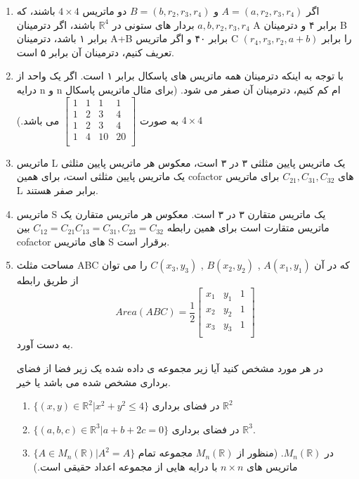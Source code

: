 \documentclass{article}
\begin{document}
\begin{enumerate}[label=\alph*)]
	     \item 
	     اگر
	     $A = (a , r_2 , r_3, r_4)$
	     و
	     $B = (b , r_2, r_3, r_4)$
	     دو ماتریس 
	     $4\times 4 $ 
	     باشند، که
	     $a , b , r_2 , r_3, r_4$
	     بردار های ستونی در 
	     $\mathbb{R}^4$
	     باشند، اگر دترمینان A  برابر ۴ و دترمینان B  برابر ۱ باشد، دترمینان A+B برابر ۴۰ و اگر ماتریس C را برابر 
	     $(r_4, r_3,r_2,a+b) $
	     تعریف کنیم، دترمینان آن برابر ۵ است.
	     \item
	     با توجه به اینکه دترمینان همه ماتریس های پاسکال برابر ۱ است. اگر یک واحد از درایه n و n ام کم کنیم، دترمینان آن صفر می شود.
	     (برای مثال ماتریس پاسکال
	     $4\times 4 $ 
	     به صورت 
	    $\begin{bmatrix}
	    1 & 1 & 1 & 1 \\
	    1 & 2 & 3 & 4 \\
	    1 & 2 &3 & 4\\
	     1 & 4 &10 & 20\\
	    \end{bmatrix}$
	    می باشد.)
	    \item 
	    ماتریس L یک ماتریس پایین مثلثی ۳ در ۳ است، معکوس هر ماتریس پایین مثلثی یک ماتریس پایین مثلثی است، برای همین cofactor های 
	    $C_{21}, C_{31}, C_{32}$
	   برای ماتریس L برابر صفر هستند.
	   \item
	   ماتریس S یک ماتریس متقارن ۳ در ۳ است. معکوس هر ماتریس متقارن یک ماتریس متقارت است برای همین رابطه 
	   $ C_{12}=C_{21} C_{13}=C_{31}, C_{23}=C_{32}$
	   بین cofactor های ماتریس S برقرار است.
	   \item
	   مساحت مثلث ABC که در آن 
	   $A(x_1,y_1)$
	   ,
	   $B(x_2,y_2)$
	   ,
	   $C(x_3,y_3)$
	 را می توان از طریق رابطه 
	   $$Area(ABC) = \frac{1}{2}
	   \begin{bmatrix}
	   	x_1 &y_1& 1\\
	   	x_2 &y_2&1\\
	   	x_3 &y_3&1\\
	   \end{bmatrix}$$
   به دست آورد.
   
   

در هر مورد مشخص کنید آیا زیر مجموعه ی داده شده یک زیر فضا از فضای برداری مشخص شده می باشد یا خیر.
\begin{enumerate}
	\item 
	$\{(x,y)\in\mathbb{R}^2|x^2+y^2 \leq4\}$
	در فضای برداری 
	$\mathbb{R}^2$
	\item
	$\{(a,b,c)\in\mathbb{R}^3|a+b+2c=0  \}$
	در فضای برداری 
	$\mathbb{R}^3$.
	\item
	$\{A\in M_n(\mathbb{R})|A^2=A\}$
	در
	$M_n(\mathbb{R})$.
	(منظور از 
	$M_n(\mathbb{R})$
	مجموعه تمام ماتریس های 
	$n\times n$
	با درایه هایی از مجموعه اعداد حقیقی است.)
	 

\end{enumerate}
\end{enumerate}
\end{document}
